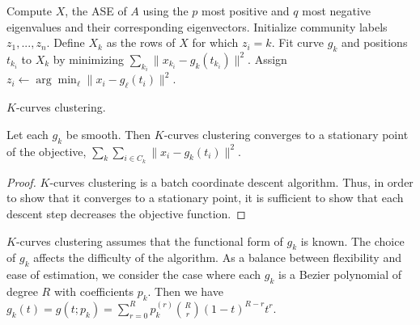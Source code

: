 \documentclass[12pt]{article}
\begin{document}
\begin{algorithm}[h]
\DontPrintSemicolon
\SetAlgoLined
{}
Compute $X$, the ASE of $A$ using the $p$ most positive and $q$ most negative eigenvalues and their corresponding eigenvectors.\;
Initialize community labels $z_1, ..., z_n$.\;
 {
 {
Define $X_k$ as the rows of $X$ for which $z_i = k$.\;
Fit curve $g_k$ and positions $t_{k_i}$ to $X_k$ by minimizing $\sum_{k_i} \|x_{k_i} - g_k(t_{k_i})\|^2$.\;
}
 {
Assign $z_i \leftarrow \arg\min_\ell \|x_i - g_\ell(t_i)\|^2$.\
}
}
\caption{$K$-curves clustering.}
\end{algorithm}

\begin{theorem}
\label{k-curves-clustering}
Let each $g_k$ be smooth. 
Then $K$-curves clustering converges to a stationary point of the objective, 
$\sum_k \sum_{i \in C_k} \|x_i - g_k(t_i)\|^2$.
\end{theorem}

\begin{proof}
$K$-curves clustering is a batch coordinate descent algorithm. 
Thus, in order to show that it converges to a stationary point, it is sufficient to show that each descent step decreases the objective function. 
\end{proof}

\(K\)-curves clustering assumes that the functional form of \(g_k\) is
known. The choice of \(g_k\) affects the difficulty of the algorithm. As
a balance between flexibility and ease of estimation, we consider the
case where each \(g_k\) is a Bezier polynomial of degree \(R\) with
coefficients \(p_k\). Then we have
\(g_k(t) = g(t; p_k) = \sum_{r=0}^R p_k^{(r)} \binom{R}{r} (1-t)^{R-r} t^r\).
\end{document}
